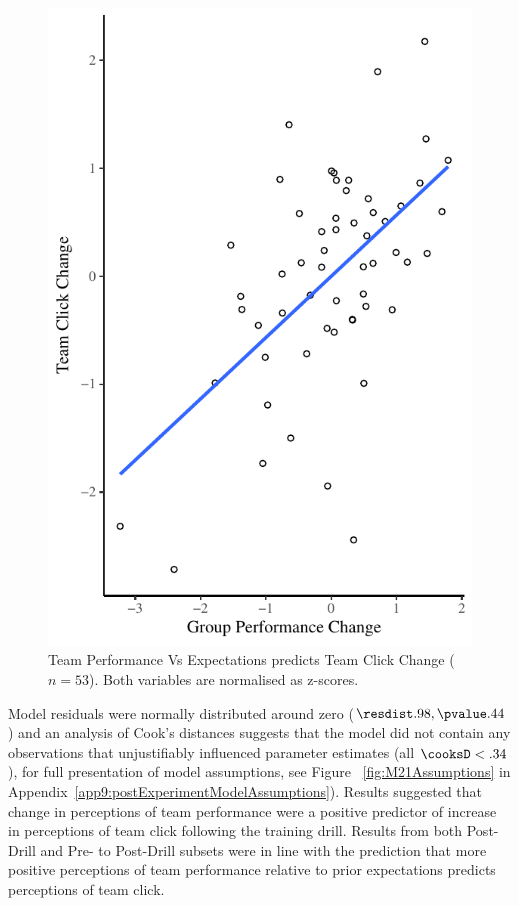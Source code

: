 \begin{CJK}{UTF8}{gbsn}
 \begin{figure}
     \centering
     \includegraphics[width=0.5\linewidth,keepaspectratio] {images/groupPerfClickChangeCondition}
     \caption{Team Performance Vs Expectations predicts Team Click Change ($n = 53$).  Both variables are normalised as z-scores.}
     \label{fig:groupPerfClickChangeCondition}
 \end{figure}

Model residuals were normally distributed around zero ($\resdist .98, \pvalue .44$) and an analysis of Cook's distances suggests that the model did not contain any observations that unjustifiably influenced parameter estimates (all $\cooksD < .34$), for full presentation of model assumptions, see Figure ~\ref{fig:M21Assumptions} in Appendix~\ref{app9:postExperimentModelAssumptions}). Results suggested that change in perceptions of team performance were a positive predictor of increase in perceptions of team click following the training drill.  Results from both Post-Drill and Pre- to Post-Drill subsets were in line with the prediction that more positive perceptions of team performance relative to prior expectations predicts perceptions of team click.





\end{CJK}
